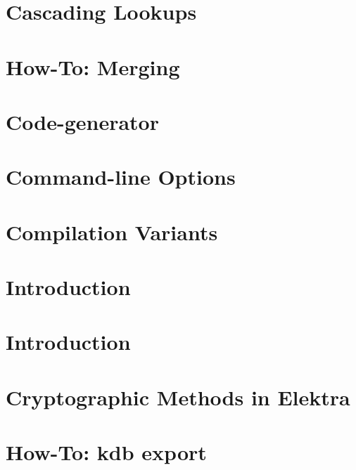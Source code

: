 \documentclass[twoside]{book}
\newcommand{\+}{\discretionary{\mbox{\scriptsize$\hookleftarrow$}}{}{}}
\begin{document}
\chapter{Cascading Lookups}
\label{doc_tutorials_cascading_md}

\chapter{How-\/\+To\+: Merging}
\label{doc_tutorials_cmerge_md}

\chapter{Code-\/generator}
\label{doc_tutorials_code-generator_md}

\chapter{Command-\/line Options}
\label{doc_tutorials_command-line-options_md}

\chapter{Compilation Variants}
\label{doc_tutorials_compilation-variants_md}

\chapter{Introduction}
\label{doc_tutorials_contributing-clion_md}

\chapter{Introduction}
\label{doc_tutorials_contributing-windows_md}

\chapter{Cryptographic Methods in Elektra}
\label{doc_tutorials_crypto_md}

\chapter{How-\/\+To\+: kdb export}
\label{doc_tutorials_export_md}

\end{document}
